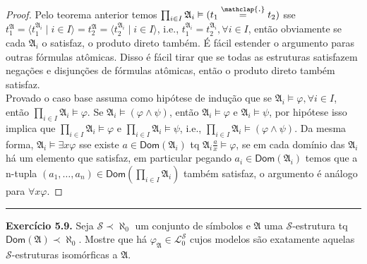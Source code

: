 \documentclass[11pt]{article}
\theoremstyle{definition}
\newcommand{\mc}[1]{\mathcal{#1}}
\newcommand{\mf}[1]{\mathfrak{#1}}
\newcommand{\msf}[1]{\mathsf{#1}}
\newcommand\overtext[2]{\stackrel{\mathclap{\normalfont\mbox{#1}}}{#2}}
\begin{document}
\begin{proof}
    Pelo teorema anterior temos $\prod_{i\in I}\mf{A}_i\vDash(t_1\overtext{.}{=}t_2)$ sse $t_1^\mf{A}=\langle t_1^{\mf{A}_i}\mid i\in I\rangle=t_2^\mf{A}=\langle t_2^{\mf{A}_i}\mid i\in I\rangle$, i.e., $t_1^{\mf{A}_i}=t_2^{\mf{A}_i},\forall i\in I$, então obviamente se cada $\mf{A}_i$ o satisfaz, o produto direto também. É fácil estender o argumento paras outras fórmulas atômicas. Disso é fácil tirar que se todas as estruturas satisfazem negações e disjunções de fórmulas atômicas, então o produto direto também satisfaz.\\
    Provado o caso base assuma como hipótese de indução que se $\mf{A}_i\vDash\varphi,\forall i\in I$, então $\prod_{i\in I}\mf{A}_i\vDash\varphi$. Se $\mf{A}_i\vDash(\varphi\wedge\psi)$, então $\mf{A}_i\vDash\varphi$ e $\mf{A}_i\vDash\psi$, por hipótese isso implica que $\prod_{i\in I}\mf{A}_i\vDash\varphi$ e $\prod_{i\in I}\mf{A}_i\vDash\psi$, i.e., $\prod_{i\in I}\mf{A}_i\vDash(\varphi\wedge\psi)$. Da mesma forma, $\mf{A}_i\vDash\exists x\varphi$ sse existe $a\in\msf{Dom}(\mf{A}_i)$ tq $\mf{A}_i\frac{a}{x}\vDash\varphi$, se em cada domínio das $\mf{A}_i$ há um elemento que satisfaz, em particular pegando $a_i\in\msf{Dom}(\mf{A}_i)$ temos que a n-tupla $(a_1,\dots,a_n)\in\msf{Dom}\left(\prod_{i\in I}\mf{A}_i\right)$ também satisfaz, o argumento é análogo para $\forall x\varphi$.
\end{proof}

\hrule

\textbf{Exercício 5.9.} Seja $\mc{S}\prec\aleph_0$ um conjunto de símbolos e $\mf{A}$ uma $\mc{S}$-estrutura tq $\msf{Dom}(\mf{A})\prec\aleph_0$. Mostre que há $\varphi_\mf{A}\in\mc{L}_0^\mc{S}$ cujos modelos são exatamente aquelas $\mc{S}$-estruturas isomórficas a $\mf{A}$.
\end{document}
